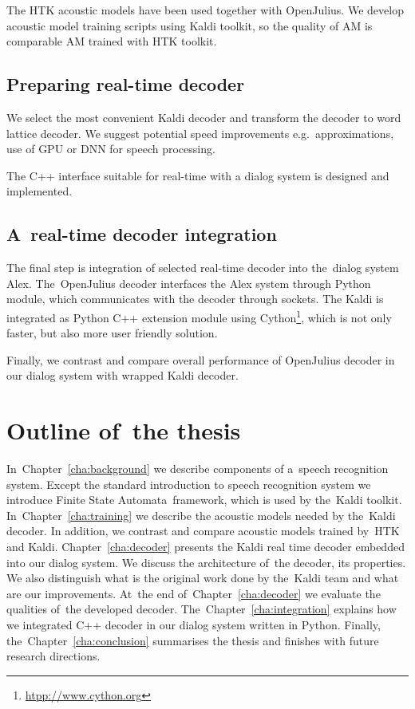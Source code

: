 The \ac{HTK} acoustic models have been used together with OpenJulius. 
We develop acoustic model training scripts using Kaldi toolkit,
so the quality of \ac{AM} is comparable \ac{AM} trained with \ac{HTK} toolkit. 

 

\subsection{Preparing real-time decoder} 
\label{sub:compare_rt}

We select the most convenient Kaldi decoder and 
transform the decoder to word lattice decoder. 
We suggest potential speed improvements e.g.\ approximations, use of \ac{GPU} 
or \ac{DNN} for speech processing\cite{TODO_KALDI_DNN}.

The C++ interface suitable for real-time with a dialog system is designed and implemented.

\subsection{A~real-time decoder integration} 
\label{sub:integration}
The final step is integration of selected real-time decoder into the~dialog system Alex.
The~OpenJulius decoder interfaces the Alex system through Python module, 
which communicates with the decoder through sockets.
The Kaldi is integrated as Python C++ extension module 
using Cython\footnote{\url{htpp://www.cython.org}}, 
which is not only faster, but also more user friendly solution.

Finally, we contrast and compare overall performance of OpenJulius decoder 
in our dialog system with wrapped Kaldi decoder.


\section{Outline of~the thesis} 
\label{sec:outline_of_the_thesis}
In~Chapter~\ref{cha:background} we describe components of a~speech recognition system.  
Except the standard introduction to speech recognition system we introduce Finite State Automata~framework,
which is used by the~Kaldi toolkit. In~Chapter~\ref{cha:training} we describe the acoustic 
models needed by the~Kaldi decoder. 
In addition, we contrast and compare acoustic models trained by~\ac{HTK} and Kaldi. 
Chapter~\ref{cha:decoder} presents the Kaldi real time decoder embedded into our dialog system.
We discuss the architecture of~the decoder, its properties. We also distinguish what is the original work done by 
the~Kaldi team and what are our improvements. At~the end of~Chapter~\ref{cha:decoder} 
we evaluate the qualities of~the developed decoder.
The~Chapter~\ref{cha:integration} explains how we integrated C++ decoder in our dialog system written in Python.
Finally, the~Chapter~\ref{cha:conclusion} summarises the thesis and finishes with future research directions.

